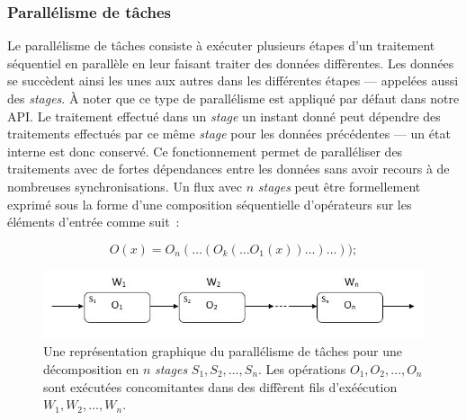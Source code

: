 


\subsubsection{Parall\'elisme de t\^aches}

Le parall\'elisme de t\^aches consiste \`a ex\'ecuter plusieurs \'etapes d'un traitement s\'equentiel en parall\`ele en leur faisant traiter des données diff\`erentes. Les donn\'ees se succ\`edent ainsi les unes aux autres dans les diff\'erentes \'etapes --- appel\'ees  aussi des \emph{stages}. \`A noter que ce type de parall\'elisme est appliqu\'e par d\'efaut dans notre API. Le traitement effectu\'e dans un \emph{stage} un instant donn\'e peut d\'ependre des traitements effectu\'es par ce m\^eme \emph{stage} pour les donn\'ees pr\'ec\'edentes --- un \'etat interne est donc conserv\'e. Ce fonctionnement permet de parall\'eliser des traitements avec de fortes d\'ependances entre les donn\'ees sans avoir recours \`a de nombreuses synchronisations. 
Un flux avec $n$ \emph{stages} peut \^etre formellement exprim\'e sous la forme d'une composition s\'equentielle d'op\'erateurs sur les \'el\'ements d'entr\'ee comme suit~: 

\[
	O(x) = O_n( \ldots (O_k( \ldots O_1(x)) \ldots ) \ldots ));
\]


\begin{figure}[ht]
\centering
     \includegraphics[width=1.0\textwidth]{Figures/ParallelismeDuFlux.jpg}
      \caption{Une repr\'esentation graphique du parall\'elisme de t\^aches pour une d\'ecomposition en $n$ \emph{stages} $S_1, S_2, \ldots, S_n$. Les op\'erations $O_1, O_2, \ldots, O_n$ sont ex\'ecut\'ees concomitantes dans des diff\`erent fils d'ex\'eécution $W_1, W_2, \ldots, W_n$.}
       \label{ParallelismeDuFlux.fig}
\end{figure}


